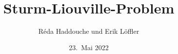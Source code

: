 %
%
%


\beamertemplatenavigationsymbolsempty
\title[Titel]{Sturm-Liouville-Problem}
\author[R.~H.~und~E.~L.]{Réda Haddouche und Erik Löffler}
\date[]{23.~Mai 2022}

